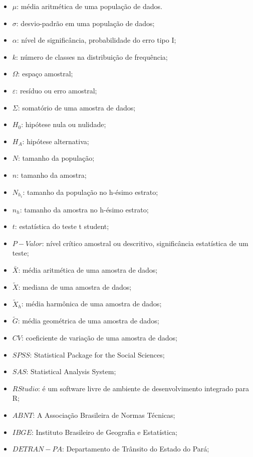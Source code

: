 \begin{refsection}

\begin{itemize}
\item $\mu$: média aritmética de uma população de dados.
\item $\sigma$: desvio-padrão em uma população de dados;
\item $\alpha$: nível de significância, probabilidade do erro tipo I;
\item $k$: número de classes na distribuição de frequência;
\item $\Omega$: espaço amostral;
\item $\varepsilon$: resíduo ou erro amostral;
\item $\Sigma$: somatório de uma amostra de dados;
\item $H_{0}$: hipótese nula ou nulidade;
\item $H_{A}$: hipótese alternativa;
\item $N$: tamanho da população; 
\item $n$: tamanho da amostra;
\item $N_{h_{i}}$: tamanho da população no h-ésimo estrato;
\item $n_{h}$: tamanho da amostra no h-ésimo estrato;
\item $t$: estatística do teste t student;
\item $P-Valor$: nível crítico amostral ou descritivo, significância estatística de um teste;
\item $\bar{X}$: média aritmética de uma amostra de dados;
\item $\widetilde{X}$: mediana de uma amostra de dados; 
\item $\widetilde{X}_{h}$: média harmônica de uma amostra de dados;  
\item $\widetilde{G}$: média geométrica de uma amostra de dados;
\item $CV$: coeficiente de variação de uma amostra de dados;
\item $SPSS$: Statistical Package for the Social Sciences;
\item $SAS$: Statistical Analysis System;
\item $RStudio$: é um software livre de ambiente de desenvolvimento integrado para R;
\item $ABNT$: A Associação Brasileira de Normas Técnicas;
\item $IBGE$: Instituto Brasileiro de Geografia e Estatística;
\item $DETRAN-PA$: Departamento de Trânsito do Estado do Pará;

\end{itemize}
\end{refsection}
